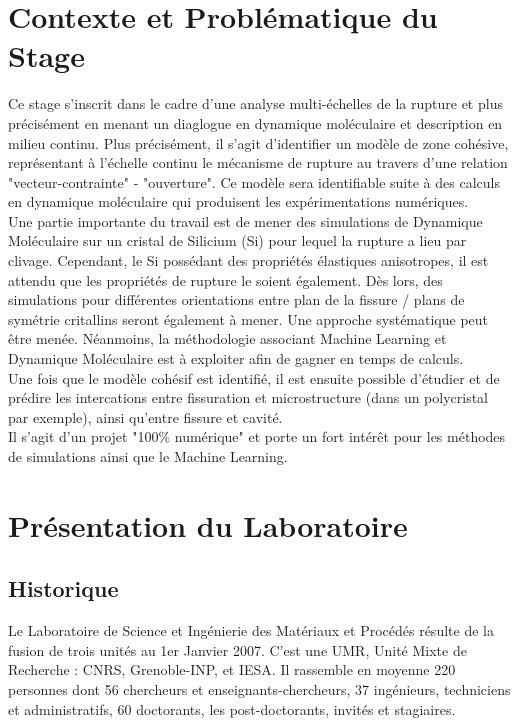 
\section{Contexte et Problématique du Stage} %

    Ce stage s'inscrit dans le cadre d'une analyse multi-échelles de la rupture et plus précisément en menant un diaglogue en dynamique moléculaire et description en milieu continu. Plus précisément, il s'agit d'identifier un modèle de zone cohésive, représentant à l'échelle continu le mécanisme de rupture au travers d'une relation "vecteur-contrainte" - "ouverture". Ce modèle sera identifiable suite à des calculs en dynamique moléculaire qui produisent les expérimentations numériques. \\

    Une partie importante du travail est de mener des simulations de Dynamique Moléculaire sur un cristal de Silicium (Si) pour lequel la rupture a lieu par clivage. Cependant, le Si possédant des propriétés élastiques anisotropes, il est attendu que les propriétés de rupture le soient également. Dès lors, des simulations pour différentes orientations entre plan de la fissure / plans de symétrie critallins seront également à mener. Une approche systématique peut être menée. Néanmoins, la méthodologie associant Machine Learning et Dynamique Moléculaire est à exploiter afin de gagner en temps de calculs. \\
    
    Une fois que le modèle cohésif est identifié, il est ensuite possible d'étudier et de prédire les intercations entre fissuration et microstructure (dans un polycristal par exemple), ainsi qu'entre fissure et cavité. \\

    Il s'agit d'un projet "100\% numérique" et porte un fort intérêt pour les méthodes de simulations ainsi que le Machine Learning.

\section{Présentation du Laboratoire}

    \subsection{Historique}

        Le Laboratoire de Science et Ingénierie des Matériaux et Procédés résulte de la fusion de trois unités au 1er Janvier 2007. C'est une UMR, Unité Mixte de Recherche : CNRS, Grenoble-INP, et IESA. Il rassemble en moyenne 220 personnes dont 56 chercheurs et enseignants-chercheurs, 37 ingénieurs, techniciens et administratifs, 60 doctorants, les post-doctorants, invités et stagiaires. 

